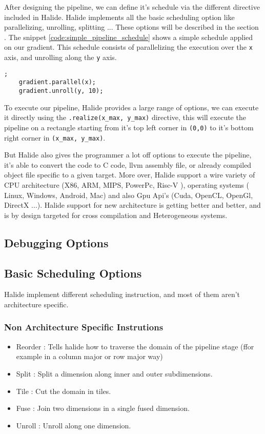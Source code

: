 	After designing the  pipeline, we can define it's schedule via the different directive included in Halide. Halide implements all the basic scheduling option like parallelizing, unrolling, splitting ... These options will be described in the section 
	. The snippet 
	\ref{code:simple_pipeline_schedule} 
	shows a simple schedule applied on our gradient. This schedule consists of parallelizing the execution over the \texttt{x} axis, and unrolling along the  \texttt{y} axis.

	\begin{lstlisting}[caption={Simple Pipeline Example}, captionpos=b,label={code:simple_pipeline_schedule}];
	gradient.parallel(x);
	gradient.unroll(y, 10);
	\end{lstlisting}


	To execute our pipeline, Halide provides a large range of options, we can execute it directly using the \verb|.realize(x_max, y_max)| directive, this will execute the pipeline on a rectangle starting from it's top left corner in  \verb|(0,0)| to it's bottom right corner in \verb|(x_max, y_max)|.
	
	But Halide also gives the programmer a lot off options to execute the pipeline, it's able to convert the code to C code, llvm assembly file, or already compiled object file specific to a given target. More over, Halide support a wire variety of CPU architecture (X86, ARM, MIPS, PowerPc, Risc-V  ), operating systems ( Linux, Windows, Android, Mac) and also Gpu Api's (Cuda, OpenCL, OpenGl, DirectX ...). Halide support for new architecture is getting better and better, and is by design targeted for cross compilation and Heterogeneous systems.

	\subsection{Debugging Options}

	\subsection {Basic Scheduling Options}
	\label{section:scheduling}
	Halide implement different scheduling instruction, and most of them aren't architecture specific. 
	\subsubsection{Non Architecture Specific Instrutions}
	\begin{itemize}
		\item Reorder : Tells halide how to traverse the domain of the pipeline stage (ffor example in a column major or row major way)
		\item Split   : Split a dimension along inner and outer subdimensions.
		\item Tile    : Cut the domain in tiles.
		\item Fuse    : Join two dimensions in a single fused dimension.
		\item Unroll  : Unroll along one dimension.
	\end{itemize}

